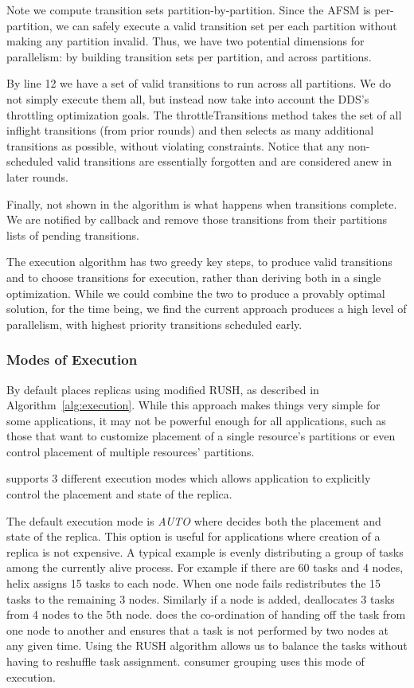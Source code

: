 Note we compute transition sets partition-by-partition.  Since the AFSM is
per-partition, we can safely execute a valid transition set per each partition
without making any partition invalid.  Thus, we have two potential dimensions for
parallelism: by building transition sets per partition, and across partitions.

By line 12 we have a set of valid transitions to run
across all partitions.  We do not simply execute them all, but instead now take
into account the DDS's throttling optimization goals.  The throttleTransitions
method takes the set of all inflight transitions (from prior rounds) and then
selects as many additional transitions as possible, without violating
constraints.  Notice that any non-scheduled valid transitions are essentially
forgotten and are considered anew in later rounds.

Finally, not shown in the algorithm is what happens when transitions complete.
We are notified by callback and remove those transitions from their partitions
lists of pending transitions.

The execution algorithm has two greedy key steps, to produce valid transitions and to
choose transitions for execution, rather than deriving both in a single
optimization.
While we could combine the two to produce a provably optimal solution, for the
time being, we find the current approach produces a high level of parallelism,
with highest priority transitions scheduled early.

\subsubsection{\helix Modes of Execution}
\label{sec:placement}
%
By default \helix places replicas using modified RUSH, as described in
Algorithm~\ref{alg:execution}.  
While this approach makes things very simple for some applications, it may not
be powerful enough for all applications, such as those that want to customize
placement of a single resource's partitions or even control placement of
multiple resources' partitions. 

\helix supports 3 different execution modes which allows application to explicitly control the placement and state of the replica.

The default execution mode is \emph{AUTO} where \helix decides both the placement and state of the replica. This option is useful 
for applications where creation of a replica is not expensive. A typical example is evenly distributing a group of tasks 
among the currently alive process. For example if there are 60 tasks and 4 nodes, helix assigns 15 tasks to each node.
 When one node fails \helix redistributes the 15 tasks to the remaining 3 nodes. Similarly if a node is added, \helix deallocates 3 
 tasks from 4 nodes to the 5th node. \helix does the co-ordination of handing off the task from one node to another and ensures that
  a task is not performed by two nodes at any given time. Using the RUSH algorithm allows us to balance the tasks without having to 
  reshuffle task assignment. \databus consumer grouping uses this mode of execution.

